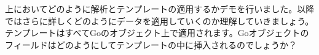 上においてどのように解析とテンプレートの適用するかデモを行いました。以降ではさらに詳しくどのようにデータを適用していくのか理解していきましょう。テンプレートはすべてGoのオブジェクト上で適用されます。Goオブジェクトのフィールドはどのようにしてテンプレートの中に挿入されるのでしょうか？
